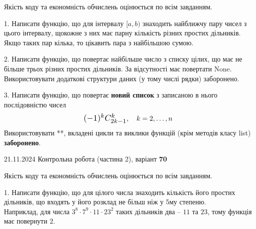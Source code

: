 \documentclass[12pt, ukrainian]{article}
\begin{document}
{{{{{{{{{{
\begin {large}
Якість коду та економність обчислень оцінюється по всім завданням.

\vspace{5mm}

1. Написати функцію, що для інтервалу $[a, b)$ знаходить найближчу пару чисел з цього інтервалу, щокожне з них має парну кількість різних простих дільників. Якщо таких пар кілька, то цікавить пара з найбільшою сумою.

\vspace{10mm}


2. Написати функцію, що повертає найбільше число з списку цілих, що має не більше трьох різних простих дільників. За відсутності має повертати None. Використовувати додаткові структури даних (у тому числі рядки) заборонено.

\vspace{10mm}


3. 
Написати функцію, що повертає \textbf{новий список} з записаною в нього послідовністю чисел
$$\scalebox{1.2}{$(-1)^{k}C_{2k-1}^{k}$}, \quad k=2,\ldots,n$$
Використовувати **, вкладені цикли та виклики функцій (крім методів класу list) \textbf{заборонено}.

\end{large}
\newpage
{{21.11.2024 Контрольна робота  (частина 2), варіант  \No \textbf { 70 }\par}}


{
\begin {large}
Якість коду та економність обчислень оцінюється по всім завданням.

\vspace{5mm}

1. Написати функцію, що для цілого числа знаходить кількість його простих дільників, що входять у його розклад не більш ніж у 5му степеню. \\ Наприклад, для числа $3^8{\cdot}7^9{\cdot}11{\cdot}23^{2}$ таких дільників два – $11$ та $23$, тому функція має повернути $2$.

\vspace{10mm}


\end{large}}}}}}}}}}}}
\end{document}
